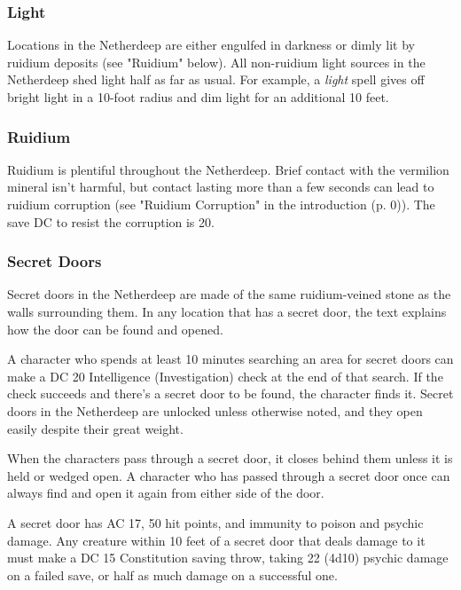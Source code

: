 \documentclass[letterpaper, 11pt, bg=full, twocolumn]{dndbook}
\begin{document}

\subsubsection{Light}

Locations in the Netherdeep are either engulfed in darkness or dimly lit by ruidium deposits (see "Ruidium" below). All non-ruidium light sources in the Netherdeep shed light half as far as usual. For example, a \textit{light} spell gives off bright light in a 10-foot radius and dim light for an additional 10 feet.

\subsubsection{Ruidium}

Ruidium is plentiful throughout the Netherdeep. Brief contact with the vermilion mineral isn't harmful, but contact lasting more than a few seconds can lead to ruidium corruption (see "Ruidium Corruption" in the introduction (p. 0)). The save DC to resist the corruption is 20.

\subsubsection{Secret Doors}

Secret doors in the Netherdeep are made of the same ruidium-veined stone as the walls surrounding them. In any location that has a secret door, the text explains how the door can be found and opened.

A character who spends at least 10 minutes searching an area for secret doors can make a DC 20 Intelligence (Investigation) check at the end of that search. If the check succeeds and there's a secret door to be found, the character finds it. Secret doors in the Netherdeep are unlocked unless otherwise noted, and they open easily despite their great weight.

When the characters pass through a secret door, it closes behind them unless it is held or wedged open. A character who has passed through a secret door once can always find and open it again from either side of the door.

A secret door has AC 17, 50 hit points, and immunity to poison and psychic damage. Any creature within 10 feet of a secret door that deals damage to it must make a DC 15 Constitution saving throw, taking 22 (4d10) psychic damage on a failed save, or half as much damage on a successful one.
\end{document}
